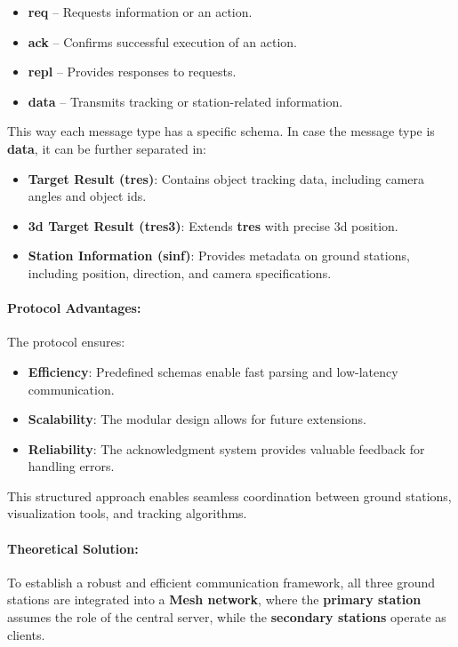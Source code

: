 \begin{itemize}
	\item \textbf{req} – Requests information or an action.
	\item \textbf{ack} – Confirms successful execution of an action.
	\item \textbf{repl} – Provides responses to requests.
	\item \textbf{data} – Transmits tracking or station-related information.
\end{itemize}

This way each message type has a specific schema. In case the message type is \textbf{data}, it can be further separated in:

\begin{itemize}
	\item \textbf{Target Result (tres)}: Contains object tracking data, including camera angles and object \acrshort{id}s.
	\item \textbf{\acrshort{3d} Target Result (tres3)}: Extends \textbf{tres} with precise \acrshort{3d} position.
	\item \textbf{Station Information (sinf)}: Provides metadata on ground stations, including position, direction, and camera specifications.
\end{itemize}

\paragraph{Protocol Advantages:}

The protocol ensures:
\begin{itemize}
	\item \textbf{Efficiency}: Predefined schemas enable fast parsing and low-latency communication.
	\item \textbf{Scalability}: The modular design allows for future extensions.
	\item \textbf{Reliability}: The acknowledgment system provides valuable feedback for handling errors.
\end{itemize}

This structured approach enables seamless coordination between ground stations, visualization tools, and tracking algorithms.

\paragraph{Theoretical Solution:}  
To establish a robust and efficient communication framework, all three ground stations are integrated into a \textbf{Mesh network}, where the \textbf{primary station} assumes the role of the central server, while the \textbf{secondary stations} operate as clients.

